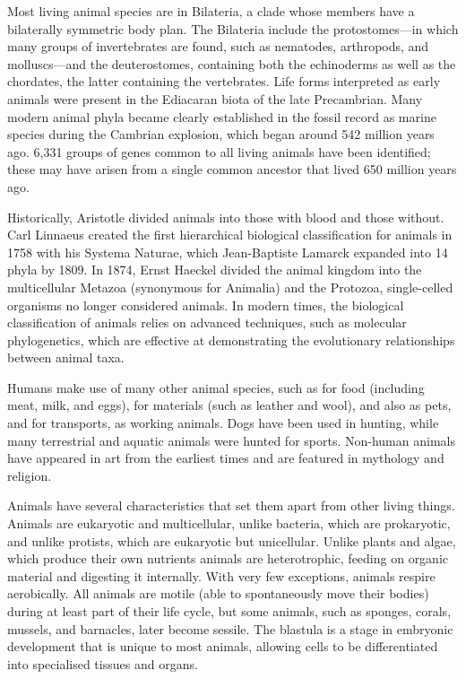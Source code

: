 Most living animal species are in Bilateria, a clade whose members have a bilaterally symmetric body plan. The Bilateria include the protostomes---in which many groups of invertebrates are found, such as nematodes, arthropods, and molluscs---and the deuterostomes, containing both the echinoderms as well as the chordates, the latter containing the vertebrates. Life forms interpreted as early animals were present in the Ediacaran biota of the late Precambrian. Many modern animal phyla became clearly established in the fossil record as marine species during the Cambrian explosion, which began around 542 million years ago. 6,331 groups of genes common to all living animals have been identified; these may have arisen from a single common ancestor that lived 650 million years ago.

Historically, Aristotle divided animals into those with blood and those without. Carl Linnaeus created the first hierarchical biological classification for animals in 1758 with his Systema Naturae, which Jean-Baptiste Lamarck expanded into 14 phyla by 1809. In 1874, Ernst Haeckel divided the animal kingdom into the multicellular Metazoa (synonymous for Animalia) and the Protozoa, single-celled organisms no longer considered animals. In modern times, the biological classification of animals relies on advanced techniques, such as molecular phylogenetics, which are effective at demonstrating the evolutionary relationships between animal taxa.

Humans make use of many other animal species, such as for food (including meat, milk, and eggs), for materials (such as leather and wool), and also as pets, and for transports, as working animals. Dogs have been used in hunting, while many terrestrial and aquatic animals were hunted for sports. Non-human animals have appeared in art from the earliest times and are featured in mythology and religion.

Animals have several characteristics that set them apart from other living things. Animals are eukaryotic and multicellular, unlike bacteria, which are prokaryotic, and unlike protists, which are eukaryotic but unicellular. Unlike plants and algae, which produce their own nutrients animals are heterotrophic, feeding on organic material and digesting it internally. With very few exceptions, animals respire aerobically. All animals are motile (able to spontaneously move their bodies) during at least part of their life cycle, but some animals, such as sponges, corals, mussels, and barnacles, later become sessile. The blastula is a stage in embryonic development that is unique to most animals, allowing cells to be differentiated into specialised tissues and organs.



